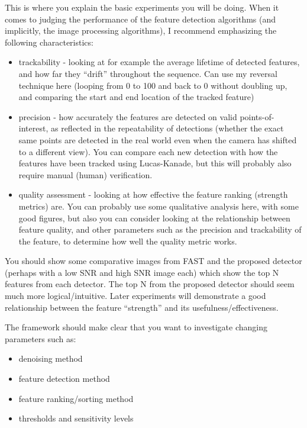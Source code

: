 


This is where you explain the basic experiments you will be doing. When it comes to judging the performance of the feature detection algorithms (and implicitly, the image processing algorithms), I recommend emphasizing the following characteristics:

\begin{itemize}
	\item trackability - looking at for example the average lifetime of detected features, and how far they "`drift"' throughout the sequence. Can use my reversal technique here (looping from 0 to 100 and back to 0 without doubling up, and comparing the start and end location of the tracked feature)
	\item precision - how accurately the features are detected on valid points-of-interest, as reflected in the repeatability of detections (whether the exact same points are detected in the real world even when the camera has shifted to a different view). You can compare each new detection with how the features have been tracked using Lucas-Kanade, but this will probably also require manual (human) verification.
	\item quality assessment - looking at how effective the feature ranking (strength metrics) are. You can probably use some qualitative analysis here, with some good figures, but also you can consider looking at the relationship between feature quality, and other parameters such as the precision and trackability of the feature, to determine how well the quality metric works.
\end{itemize}

You should show some comparative images from FAST and the proposed detector (perhaps with a low SNR and high SNR image each) which show the top N features from each detector. The top N from the proposed detector should seem much more logical/intuitive. Later experiments will demonstrate a good relationship between the feature "`strength"' and its usefulness/effectiveness.

The framework should make clear that you want to investigate changing parameters such as:

\begin{itemize}
	\item denoising method
	\item feature detection method
	\item feature ranking/sorting method
	\item thresholds and sensitivity levels
\end{itemize}